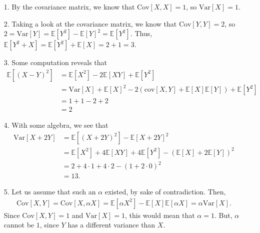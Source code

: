 \documentclass[a4paper]{article}
\begin{document}
\begin{Solution}
	\begin{itemize}
		\item[1.] By the covariance matrix, we know that $\text{Cov}[X, X] = 1$, so $\text{Var}[X] = 1.$
		\item[2.] Taking a look at the covariance matrix, we know that $\text{Cov}[Y, Y] = 2$, so $2 = \text{Var}[Y] = \mathbb{E}[Y^2] - \mathbb{E}[Y]^2 = \mathbb{E}[Y^2]$. Thus, $\mathbb{E}[Y^2 + X] = \mathbb{E}[Y^2] + \mathbb{E}[X] = 2 + 1 = 3.$
		\item[3.] Some computation reveals that
			\begin{align*}
				\mathbb{E}[(X - Y)^2] &= \mathbb{E}[X^2] - 2 \mathbb{E}[XY] + \mathbb{E}[Y^2] \\ &= \text{Var}[X] + \mathbb{E}[X]^2 - 2 \left( \text{cov}[X, Y] + \mathbb{E}[X] \mathbb{E}[Y] \right) + \mathbb{E}[Y^2] \\
				&= 1 + 1 - 2 + 2 \\
					&= 2
			\end{align*}
		\item[4.] With some algebra, we see that
			\begin{align*}
				\text{Var}[X + 2Y] &= \mathbb{E}[(X + 2Y)^2] - \mathbb{E}[X + 2Y]^2 
						\\ &= \mathbb{E}[X^2] + 4 \mathbb{E}[XY] + 4\mathbb{E}[Y^2] - \left( \mathbb{E}[X] + 2 \mathbb{E}[Y] \right)^2
						\\ &= 2 + 4 \cdot 1 + 4 \cdot 2 - (1 + 2 \cdot 0)^2 
						\\ &= 13.
			\end{align*}
		\item[5.] Let us assume that such an $\alpha$ existed, by sake of contradiction. Then,
			\begin{align*}
				\text{Cov}[X, Y] = \text{Cov}[X, \alpha X] = \mathbb{E}[\alpha X^2] - \mathbb{E}[X] \mathbb{E}[\alpha X] = \alpha \text{Var}[X].
			\end{align*}
			Since $\text{Cov}[X, Y] = 1$ and $\text{Var}[X]= 1$, this would mean that $\alpha = 1$. But, $\alpha$ cannot be $1$, since $Y$ has a different variance than $X$.
	\end{itemize}
\end{Solution}
\end{document}
